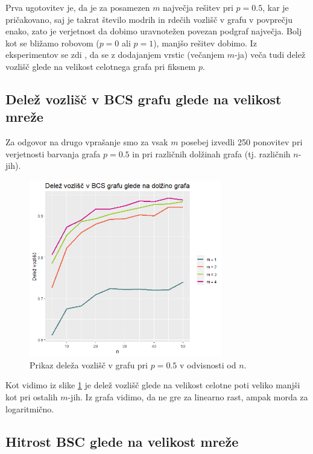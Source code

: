 \documentclass[a4paper, 11pt]{article}
\theoremstyle{definition}
\theoremstyle{definition}
\begin{document}
Prva ugotovitev je, da je za posamezen $m$  največja rešitev pri $p=0.5$, 
kar je pričakovano, saj je takrat število modrih in rdečih vozlišč v 
grafu v povprečju enako, zato je verjetnost da dobimo uravnotežen povezan 
podgraf največja. 
Bolj kot se bližamo robovom ($p=0$ ali $p=1$), manjšo rešitev dobimo. 
Iz eksperimentov se zdi 
, da se z dodajanjem vrstic (večanjem $m$-ja) veča tudi delež vozlišč glede 
na velikost celotnega grafa pri fiksnem $p$.

\newpage

\subsection{Delež vozlišč v BCS grafu glede na velikost mreže}

Za odgovor na drugo vprašanje smo za vsak $m$ posebej izvedli 250 ponovitev pri 
verjetnosti barvanja grafa $p = 0.5$ in pri različnih dolžinah grafa 
(tj. različnih $n$-jih). 

\begin{figure}[h]
    \centering
    \includegraphics[width=0.75\textwidth]{delez.png}
    \caption{Prikaz deleža vozlišč v grafu pri $p=0.5$ v
    odvisnosti od $n$.}
    \label{fig:delez}
\end{figure}


Kot vidimo iz slike \ref{fig:delez} je delež vozlišč glede na 
velikost celotne poti veliko manjši kot pri ostalih $m$-jih. 
Iz grafa vidimo, da ne gre za linearno rast, ampak morda za logaritmično.


\subsection{Hitrost BSC glede na velikost mreže}
\end{document}

